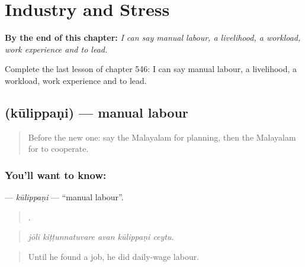 
\chapter{Industry and Stress}
\label{ch:ml-industry-and-stress}

\begin{chapteropening}
\textbf{By the end of this chapter:} \emph{I can say manual labour, a livelihood, a workload, work experience and to lead.}

Complete the last lesson of chapter 546: I can say manual labour, a livelihood, a workload, work experience and to lead.
\end{chapteropening}

\section[\texorpdfstring{\ml{കൂലിപ്പണി} (kūlippaṇi)}{കൂലിപ്പണി (kūlippaṇi)}]{ (kūlippaṇi) — manual labour}

\label{lesson:ML-C546-kulippani}



\begin{quote}
Before the new one: say the Malayalam for planning, then the Malayalam for to cooperate.
\end{quote}

\subsection*{You'll want to know: }
\textbf{} — \emph{kūlippaṇi} — \textquotedblleft{}manual labour\textquotedblright{}.

\begin{quote}
    .
\end{quote}

\begin{quote}
\emph{jōli kiṭṭunnatuvare avan kūlippaṇi ceytu.}
\end{quote}

\begin{quote}
Until he found a job, he did daily-wage labour.
\end{quote}

